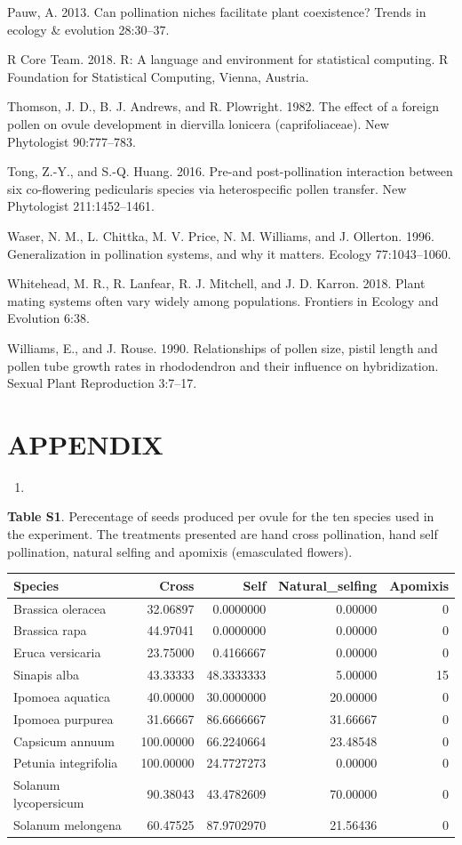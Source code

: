 \documentclass[11pt,a4paper]{article}
\begin{document}
\hypertarget{ref-pauw2013}{}
Pauw, A. 2013. Can pollination niches facilitate plant coexistence?
Trends in ecology \& evolution 28:30--37.

\hypertarget{ref-R_Core_Team_2018}{}
R Core Team. 2018. R: A language and environment for statistical
computing. R Foundation for Statistical Computing, Vienna, Austria.

\hypertarget{ref-thomson1982}{}
Thomson, J. D., B. J. Andrews, and R. Plowright. 1982. The effect of a
foreign pollen on ovule development in diervilla lonicera
(caprifoliaceae). New Phytologist 90:777--783.

\hypertarget{ref-tong2016}{}
Tong, Z.-Y., and S.-Q. Huang. 2016. Pre-and post-pollination interaction
between six co-flowering pedicularis species via heterospecific pollen
transfer. New Phytologist 211:1452--1461.

\hypertarget{ref-waser1996}{}
Waser, N. M., L. Chittka, M. V. Price, N. M. Williams, and J. Ollerton.
1996. Generalization in pollination systems, and why it matters. Ecology
77:1043--1060.

\hypertarget{ref-whitehead2018}{}
Whitehead, M. R., R. Lanfear, R. J. Mitchell, and J. D. Karron. 2018.
Plant mating systems often vary widely among populations. Frontiers in
Ecology and Evolution 6:38.

\hypertarget{ref-williams1990}{}
Williams, E., and J. Rouse. 1990. Relationships of pollen size, pistil
length and pollen tube growth rates in rhododendron and their influence
on hybridization. Sexual Plant Reproduction 3:7--17.

\section{APPENDIX}\label{appendix}

\begin{enumerate}
\def\labelenumi{\arabic{enumi}.}
\item
\end{enumerate}

\textbf{Table S1}. Perecentage of seeds produced per ovule for the ten
species used in the experiment. The treatments presented are hand cross
pollination, hand self pollination, natural selfing and apomixis
(emasculated flowers).

\begin{longtable}[]{@{}lrrrr@{}}
\toprule
Species & Cross & Self & Natural\_selfing & Apomixis\tabularnewline
\midrule
\endhead
Brassica oleracea & 32.06897 & 0.0000000 & 0.00000 & 0\tabularnewline
Brassica rapa & 44.97041 & 0.0000000 & 0.00000 & 0\tabularnewline
Eruca versicaria & 23.75000 & 0.4166667 & 0.00000 & 0\tabularnewline
Sinapis alba & 43.33333 & 48.3333333 & 5.00000 & 15\tabularnewline
Ipomoea aquatica & 40.00000 & 30.0000000 & 20.00000 & 0\tabularnewline
Ipomoea purpurea & 31.66667 & 86.6666667 & 31.66667 & 0\tabularnewline
Capsicum annuum & 100.00000 & 66.2240664 & 23.48548 & 0\tabularnewline
Petunia integrifolia & 100.00000 & 24.7727273 & 0.00000 &
0\tabularnewline
Solanum lycopersicum & 90.38043 & 43.4782609 & 70.00000 &
0\tabularnewline
Solanum melongena & 60.47525 & 87.9702970 & 21.56436 & 0\tabularnewline
\bottomrule
\end{longtable}
\end{document}
